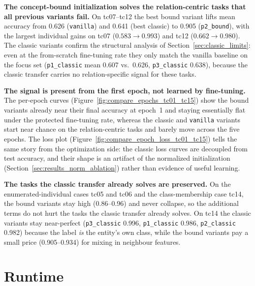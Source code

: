 \documentclass[a4paper,oneside,bibliography=totoc]{scrbook}
\begin{document}
\textbf{The concept-bound initialization solves the relation-centric tasks
that all previous variants fail.} On tc07--tc12 the best bound variant lifts
mean accuracy from 0.626 (\texttt{vanilla}) and 0.641 (best classic) to 0.905
(\texttt{p2\_bound}), with the largest individual gains on tc07
($0.583 \rightarrow 0.993$) and tc12 ($0.662 \rightarrow 0.980$). The classic
variants confirm the structural analysis of
Section~\ref{sec:classic_limits}: even at the from-scratch fine-tuning rate they
only match the vanilla baseline on the focus set (\texttt{p1\_classic} mean 0.607
vs.\ 0.626, \texttt{p3\_classic} 0.638), because the classic transfer carries no
relation-specific signal for these tasks.

\textbf{The signal is present from the first epoch, not learned by fine-tuning.}
The per-epoch curves (Figure~\ref{fig:compare_epochs_tc01_tc15}) show the bound
variants already near their final accuracy at epoch~1 and staying essentially
flat under the protected fine-tuning rate, whereas the classic and \texttt{vanilla}
variants start near chance on the relation-centric tasks and barely move across the
five epochs. The loss plot (Figure~\ref{fig:compare_epoch_loss_tc01_tc15}) tells
the same story from the optimization side: the classic loss curves are decoupled
from test accuracy, and their shape is an artifact of the normalized
initialization (Section~\ref{sec:results_norm_ablation}) rather than evidence of
useful learning.

\textbf{The tasks the classic transfer already solves are preserved.} On the
enumerated-individual cases tc05 and tc06 and the class-membership case tc14, the
bound variants stay high (0.86--0.96) and never collapse, so the additional terms
do not hurt the tasks the classic transfer already solves. On tc14 the classic
variants stay near-perfect (\texttt{p3\_classic} 0.996, \texttt{p1\_classic}
0.986, \texttt{p2\_classic} 0.982) because the label \emph{is} the entity's own
class, while the bound variants pay a small price (0.905--0.934) for mixing in
neighbour features.

\section{Runtime}
\label{sec:results_runtime}
\end{document}
